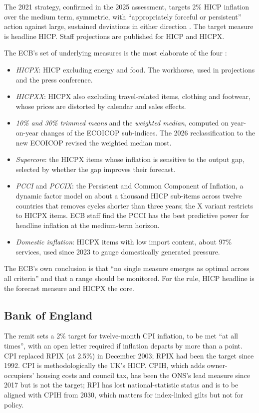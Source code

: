\documentclass[11pt,a4paper]{article}
\begin{document}
The 2021 strategy, confirmed in the 2025 assessment, targets 2\% HICP inflation over the medium term, symmetric, with ``appropriately forceful or persistent'' action against large, sustained deviations in either direction \parencite{ecbstrategy2025}. The target measure is headline HICP. Staff projections are published for HICP and HICPX.

The ECB's set of underlying measures is the most elaborate of the four \parencite{ecbunderlying2018,banbura2023,ecbunderlying2026}:
\begin{itemize}
\item \emph{HICPX}: HICP excluding energy and food. The workhorse, used in projections and the press conference.
\item \emph{HICPXX}: HICPX also excluding travel-related items, clothing and footwear, whose prices are distorted by calendar and sales effects.
\item \emph{10\% and 30\% trimmed means} and the \emph{weighted median}, computed on year-on-year changes of the ECOICOP sub-indices. The 2026 reclassification to the new ECOICOP revised the weighted median most.
\item \emph{Supercore}: the HICPX items whose inflation is sensitive to the output gap, selected by whether the gap improves their forecast.
\item \emph{PCCI} and \emph{PCCIX}: the Persistent and Common Component of Inflation, a dynamic factor model on about a thousand HICP sub-items across twelve countries that removes cycles shorter than three years; the X variant restricts to HICPX items. ECB staff find the PCCI has the best predictive power for headline inflation at the medium-term horizon.
\item \emph{Domestic inflation}: HICPX items with low import content, about 97\% services, used since 2023 to gauge domestically generated pressure.
\end{itemize}
The ECB's own conclusion is that ``no single measure emerges as optimal across all criteria'' and that a range should be monitored. For the rule, HICP headline is the forecast measure and HICPX the core.

\subsection{Bank of England}

The remit sets a 2\% target for twelve-month CPI inflation, to be met ``at all times'', with an open letter required if inflation departs by more than a point. CPI replaced RPIX (at 2.5\%) in December 2003; RPIX had been the target since 1992. CPI is methodologically the UK's HICP. CPIH, which adds owner-occupiers' housing costs and council tax, has been the ONS's lead measure since 2017 but is not the target; RPI has lost national-statistic status and is to be aligned with CPIH from 2030, which matters for index-linked gilts but not for policy.
\end{document}
